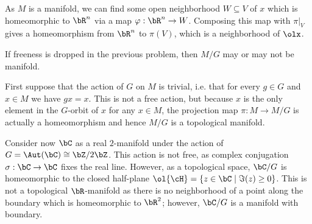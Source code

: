 \begin{homework}[e]
\begin{prf}
		As $M$ is a manifold, we can find some open neighborhood $W\subseteq V$ of $x$ which is homeomorphic to $\bR^n$ via a map $\varphi:\bR^n \to W$. Composing this map with $\pi|_V$ gives a homeomorphism from $\bR^n$ to $\pi(V)$, which is a neighborhood of $\olx$.
	\end{prf}

	\prob If freeness is dropped in the previous problem, then $M/G$ may or may not be manifold. 
	\begin{prf}
		First suppose that the action of $G$ on $M$ is trivial, i.e. that for every $g \in G$ and $x \in M$ we have $gx = x$. This is not a free action, but because $x$ is the only element in the $G$-orbit of $x$ for any $x \in M$, the projection map $\pi:M\to M/G$ is actually a homeomorphism and hence $M/G$ is a topological manifold.

		Consider now $\bC$ as a real $2$-manifold under the action of $G = \Aut(\bC) \cong \bZ/2\bZ$. This action is not free, as complex conjugation $\sigma:\bC\to \bC$ fixes the real line. However, as a topological space, $\bC/G$ is homeomorphic to the closed half-plane $\ol{\cH} = \{z \in \bC \mid \Im(z) \geq 0\}$. This is not a topological $\bR$-manifold as there is no neighborhood of a point along the boundary which is homeomorphic to $\bR^2$; however, $\bC/G$ is a manifold with boundary.
	\end{prf}


\end{homework}
